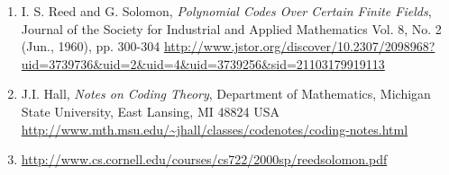 \documentclass{article}
\begin{document}
\begin{enumerate}
	\item I. S. Reed and G. Solomon, \textit{Polynomial Codes Over Certain Finite Fields},			Journal of the Society for Industrial and Applied Mathematics
			Vol. 8, No. 2 (Jun., 1960), pp. 300-304
\url{http://www.jstor.org/discover/10.2307/2098968?uid=3739736&uid=2&uid=4&uid=3739256&sid=21103179919113}
			
	\item J.I. Hall, \textit{Notes on Coding Theory}, Department of Mathematics,
Michigan State University,
East Lansing, MI 48824 USA
\url{http://www.mth.msu.edu/~jhall/classes/codenotes/coding-notes.html}


	\item \url{http://www.cs.cornell.edu/courses/cs722/2000sp/reedsolomon.pdf}
		  
\end{enumerate}
\end{document}
